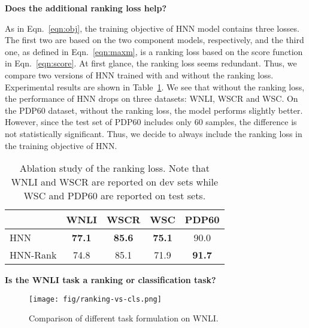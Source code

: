 \documentclass[11pt,a4paper]{article}
\newcommand{\nmodel}{HNN}
\newcommand{\wsc}{WSC}
\begin{document}
\noindent \textbf{Does the additional ranking loss help?}

As in Eqn.~\ref{eqn:obj}, the training objective of {\nmodel} model contains three losses. The first two are based on the two component models, respectively, and the third one, as defined in Eqn.~\ref{eqn:maxm}, is a ranking loss based on the score function in Eqn.~\ref{eqn:score}. At first glance, the ranking loss seems redundant. 
Thus, we compare two versions of HNN trained with and without the ranking loss.
Experimental results are shown in Table~\ref{tab:ranking_loss}. We see that without the ranking loss, the performance of {\nmodel} drops on three datasets: WNLI, WSCR and WSC. On the PDP60 dataset, without the ranking loss, the model performs slightly better. However, since the test set of PDP60 includes only 60 samples, the difference is not statistically significant. 
Thus, we decide to always include the ranking loss in the training objective of HNN.


\begin{table}[htb]
	\begin{center}
		\begin{tabular}{@{\hskip1pt}l |c c |c c } \hline
			 &WNLI &WSCR & {\wsc} & PDP60 \\ \hline \hline
            {\nmodel} &{\bf 77.1} & \bf 85.6 &\bf 75.1 &  90.0\\\hline
            {\nmodel}-Rank & 74.8 &85.1& 71.9 &  \bf 91.7\\\hline
		\end{tabular}
	\end{center}
    \caption{Ablation study of the ranking loss. Note that WNLI and WSCR are reported on dev sets while WSC and PDP60 are reported on test sets.}
	\label{tab:ranking_loss}
\end{table}


\noindent \textbf{Is the WNLI task a ranking or classification task?}








\begin{figure}[htb]
	\centering
    {
	\texttt{[image: fig/ranking-vs-cls.png]}
    }
	\caption{Comparison of different task formulation on WNLI.}
\label{fig:rank_cls}
\end{figure}
\end{document}
